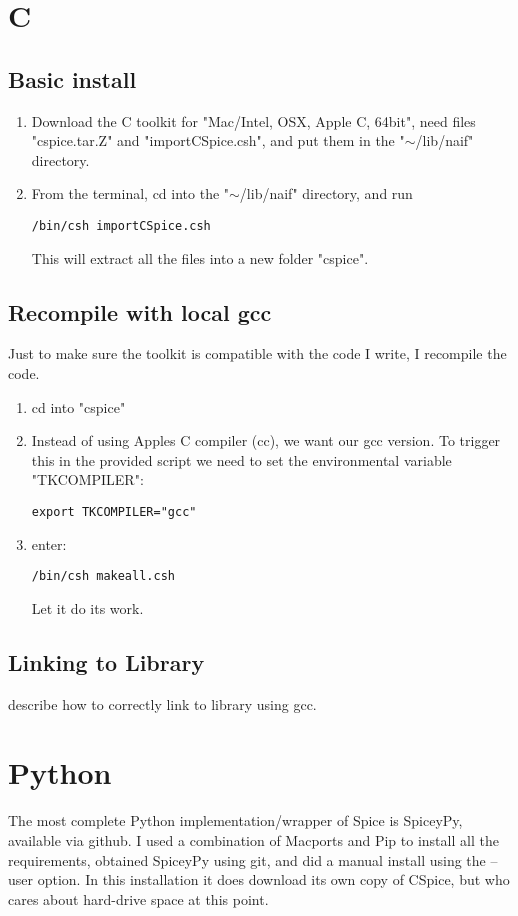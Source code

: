 \documentclass[11pt]{article}
\begin{document}
\section{C}

\subsection{Basic install}
\begin{enumerate}
	\item Download the C toolkit for "Mac/Intel, OSX, Apple C, 64bit", need files "cspice.tar.Z" and "importCSpice.csh", and put them in the "$\sim$/lib/naif" directory.
	\item From the terminal, cd into the "$\sim$/lib/naif" directory, and run 
\begin{lstlisting}[style=Bash]
/bin/csh importCSpice.csh
\end{lstlisting}	
	This will extract all the files into a new folder "cspice".
\end{enumerate}

\subsection{Recompile with local gcc}
Just to make sure the toolkit is compatible with the code I write, I recompile the code.
\begin{enumerate}
	\item cd into "cspice"
	\item Instead of using Apples C compiler (cc), we want our gcc version. To trigger this in the provided script we need to set the environmental variable "TKCOMPILER":
\begin{lstlisting}[style=Bash]
export TKCOMPILER="gcc"
\end{lstlisting} 
	\item enter:
\begin{lstlisting}[style=Bash]
/bin/csh makeall.csh
\end{lstlisting} 
	 Let it do its work.
\end{enumerate}

\subsection{Linking to Library}
describe how to correctly link to library using gcc.



\section{Python}

The most complete Python implementation/wrapper of Spice is SpiceyPy, available via github. I used a combination of Macports and Pip to install all the requirements, obtained SpiceyPy using git, and did a manual install using the --user option. In this installation it does download its own copy of CSpice, but who cares about hard-drive space at this point.
\end{document}
